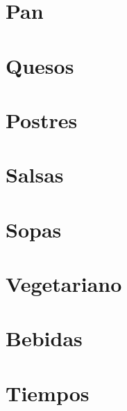\documentclass[twoside,12pt]{article}
\begin{document}
\section{Pan}



\section{Quesos}



\section{Postres}




















\section{Salsas}








\section{Sopas}



\section{Vegetariano}


\section{Bebidas}


\section{Tiempos}

\end{document}
